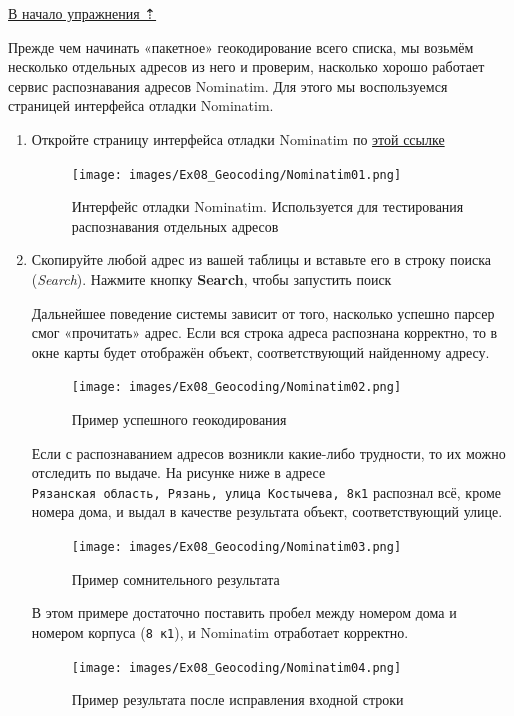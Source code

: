 \documentclass[
  12pt,
]{book}
\begin{document}
\protect\hyperlink{geocoding}{В начало упражнения ⇡}

Прежде чем начинать «пакетное» геокодирование всего списка, мы возьмём несколько отдельных адресов из него и проверим, насколько хорошо работает сервис распознавания адресов Nominatim. Для этого мы воспользуемся страницей интерфейса отладки Nominatim.

\begin{enumerate}
\def\labelenumi{\arabic{enumi}.}
\item
  Откройте страницу интерфейса отладки Nominatim по \href{https://nominatim.openstreetmap.org/ui/search.html}{этой ссылке}

  \begin{figure}
  \centering
  \texttt{[image: images/Ex08\_Geocoding/Nominatim01.png]}
  \caption{Интерфейс отладки Nominatim. Используется для тестирования распознавания отдельных адресов}
  \end{figure}
\item
  Скопируйте любой адрес из вашей таблицы и вставьте его в строку поиска (\emph{Search}). Нажмите кнопку \textbf{Search}, чтобы запустить поиск

  Дальнейшее поведение системы зависит от того, насколько успешно парсер смог «прочитать» адрес. Если вся строка адреса распознана корректно, то в окне карты будет отображён объект, соответствующий найденному адресу.

  \begin{figure}
  \centering
  \texttt{[image: images/Ex08\_Geocoding/Nominatim02.png]}
  \caption{Пример успешного геокодирования}
  \end{figure}

  Если с распознаванием адресов возникли какие-либо трудности, то их можно отследить по выдаче. На рисунке ниже в адресе \texttt{Рязанская\ область,\ Рязань,\ улица\ Костычева,\ 8к1} распознал всё, кроме номера дома, и выдал в качестве результата объект, соответствующий улице.

  \begin{figure}
  \centering
  \texttt{[image: images/Ex08\_Geocoding/Nominatim03.png]}
  \caption{Пример сомнительного результата}
  \end{figure}

  В этом примере достаточно поставить пробел между номером дома и номером корпуса (\texttt{8\ к1}), и Nominatim отработает корректно.

  \begin{figure}
  \centering
  \texttt{[image: images/Ex08\_Geocoding/Nominatim04.png]}
  \caption{Пример результата после исправления входной строки}
  \end{figure}


\end{enumerate}
\end{document}
